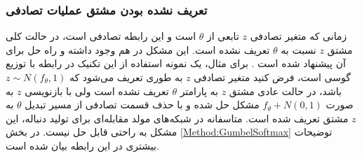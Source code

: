 \subsubsection{تعریف نشده بودن مشتق عملیات تصادفی}
زمانی که متغیر تصادفی $z$ تابعی از $\theta$ است و این رابطه تصادفی است، در حالت کلی مشتق $z$ نسبت به $\theta$ تعریف نشده است. این مشکل در
هم وجود داشته و راه حل
برای آن پیشنهاد شده است
\cite{JanGuPoo17}.
\newline
 برای مثال، یک نمونه استفاده از این تکنیک در رابطه با توزیع گوسی است، فرض کنید متغیر تصادفی $z$ به طوری تعریف می‌شود که
$z \sim N(f_\theta,1)$
باشد، در حالت عادی مشتق $z$ به پارامتر $\theta$ تعریف نشده است ولی با بازنویسی $z$ به صورت
$f_\theta + N(0,1)$
مشکل حل شده و با حذف قسمت تصادفی از مسیر تبدیل $\theta$ به $z$ مشتق تعریف شده است. متاسفانه در شبکه‌های مولد مقابله‌ای برای تولید دنباله، این مشکل به راحتی قابل حل نیست.
 در بخش
\ref{Method:GumbelSoftmax}
توضیحات بیشتری در این رابطه بیان شده است.

